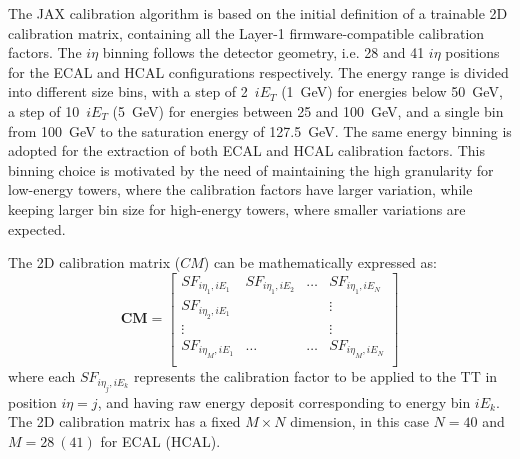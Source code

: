 The JAX calibration algorithm is based on the initial definition of a trainable 2D calibration matrix, containing all the Layer-1 firmware-compatible calibration factors. The $i\eta$ binning follows the detector geometry, i.e. 28 and 41 $i\eta$ positions for the ECAL and HCAL configurations respectively. The energy range is divided into different size bins, with a step of 2~$iE_T$ (1~GeV) for energies below 50~GeV, a step of 10~$iE_T$ (5~GeV) for energies between 25 and 100~GeV, and a single bin from 100~GeV to the saturation energy of 127.5~GeV. The same energy binning is adopted for the extraction of both ECAL and HCAL calibration factors.
This binning choice is motivated by the need of maintaining the high granularity for low-energy towers, where the calibration factors have larger variation, while keeping larger bin size for high-energy towers, where smaller variations are expected.

The 2D calibration matrix ($CM$) can be mathematically expressed as:
\begin{equation}
    \textbf{CM} = \begin{bmatrix} 
    SF_{i\eta_1,iE_1} & SF_{i\eta_1,iE_2} & \dots & SF_{i\eta_1,iE_N} \\
    SF_{i\eta_2,iE_1} & & & \vdots \\
    \vdots & & & \vdots \\
    SF_{i\eta_M,iE_1} & \dots & \dots & SF_{i\eta_M,iE_N} \\
    \end{bmatrix}
\end{equation}
where each $SF_{i\eta_j,iE_k}$ represents the calibration factor to be applied to the TT in position $i\eta=j$, and having raw energy deposit corresponding to energy bin $iE_k$. The 2D calibration matrix has a fixed $M\times N$ dimension, in this case $N=40$ and $M=28~(41)$ for ECAL (HCAL).

\bigbreak

